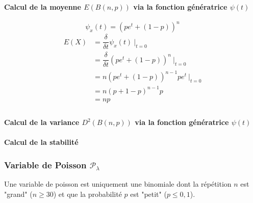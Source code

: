 \paragraph{Calcul de la moyenne $E(B(n,p))$ via la fonction génératrice $\psi(t)$}
$$\boxed{\psi_x(t) = (pe^t+(1-p))^n}$$
\begin{align*}
E(X) &= \dfrac{\delta}{\delta t} \psi_x(t)\ |_{t=0}\\
     &= \dfrac{\delta}{\delta t} ( pe^t + (1-p))^n\ |_{t=0}\\
     &= n ( pe^t + (1-p) )^{n-1} pe^t\ |_{t=0}\\
     &= n ( p + 1 - p )^{n-1} p\\
     &= np\\
\end{align*}

\paragraph{Calcul de la variance $D^2(B(n,p))$ via la fonction génératrice $\psi(t)$}


\paragraph{Calcul de la stabilité}



\newpage
\subsubsection{Variable de Poisson $\mathcal{P}_\lambda$}
Une variable de poisson est uniquement une binomiale dont la répétition $n$ est "grand" ($n\geq30$) et que la probabilité $p$ est "petit" ($p\leq0,1$).

